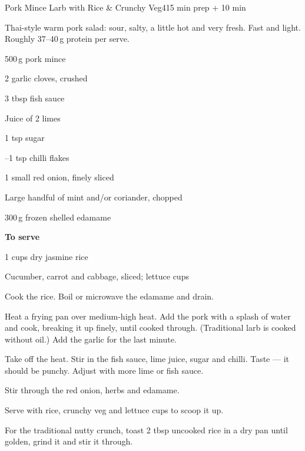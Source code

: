 \begin{recipebox}{Pork Mince Larb with Rice \& Crunchy Veg}{4}{15 min prep + 10 min}

Thai-style warm pork salad: sour, salty, a little hot and very fresh. Fast
and light. Roughly 37--40\,g protein per serve.

\begin{ingredients}
  \item 500\,g pork mince
  \item 2 garlic cloves, crushed
  \item 3 tbsp fish sauce
  \item Juice of 2 limes
  \item 1 tsp sugar
  \item {}--1 tsp chilli flakes
  \item 1 small red onion, finely sliced
  \item Large handful of mint and/or coriander, chopped
  \item 300\,g frozen shelled edamame
  \item[] \textbf{To serve}
  \item 1 cups dry jasmine rice
  \item Cucumber, carrot and cabbage, sliced; lettuce cups
\end{ingredients}

\begin{method}
  \item Cook the rice. Boil or microwave the edamame and drain.
  \item Heat a frying pan over medium-high heat. Add the pork with a splash of water and cook, breaking it up finely, until cooked through. (Traditional larb is cooked without oil.) Add the garlic for the last minute.
  \item Take off the heat. Stir in the fish sauce, lime juice, sugar and chilli. Taste --- it should be punchy. Adjust with more lime or fish sauce.
  \item Stir through the red onion, herbs and edamame.
  \item Serve with rice, crunchy veg and lettuce cups to scoop it up.
\end{method}

\begin{notelist}
  \item For the traditional nutty crunch, toast 2 tbsp uncooked rice in a dry pan until golden, grind it and stir it through.
\end{notelist}

\end{recipebox}
